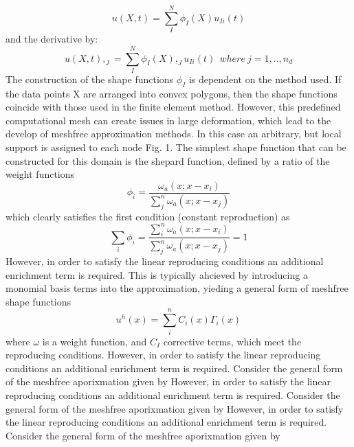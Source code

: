 \begin{equation}
u(X,t) = \sum_I^N \phi_I(X) u_{Ii}(t)
\end{equation}
and the derivative by:
\begin{equation}
u(X,t),_J = \sum_I^N \phi_I(X),_J u_{Ii}(t) ~~where~j = 1,..,n_d
\end{equation}
The construction of the shape functions $\phi_I$ is dependent on the method used. If the data points X are arranged into convex polygons, then the shape functions coincide with those used in the finite element method. However, this predefined computational mesh can create issues in large deformation, which lead to the develop of meshfree approximation methods. In this case an arbitrary, but local support is assigned to each node Fig. 1. The simplest shape function that can be constructed for this domain is the shepard function, defined by a ratio of the weight functions
\begin{equation}
\phi_i = \frac{\omega_a (x; x-x_i)}{\sum_j^n \omega_a(x;x-x_j)} 
\end{equation}
which clearly satisfies the first condition (constant reproduction) as
\begin{equation}
\sum_i \phi_i = \frac{\sum_i^n\omega_a (x; x-x_i)}{\sum_j^n \omega_a(x;x-x_j)} = 1
\end{equation}
However, in order to satisfy the linear reproducing conditions an additional enrichment term is required. This is typically ahcieved by introducing a monomial basis terms into the approximation, yieding a general form of meshfree shape functions
\begin{equation}
u^h(x) = \sum_i^n C_i(x) \Gamma_i(x)
\end{equation}
where $\omega$ is a weight function, and $C_I$ corrective terms, which meet the reproducing conditions. 
However, in order to satisfy the linear reproducing conditions an additional enrichment term is required. Consider the general form of the meshfree aporixmation given by 
However, in order to satisfy the linear reproducing conditions an additional enrichment term is required. Consider the general form of the meshfree aporixmation given by 
However, in order to satisfy the linear reproducing conditions an additional enrichment term is required. Consider the general form of the meshfree aporixmation given by 
